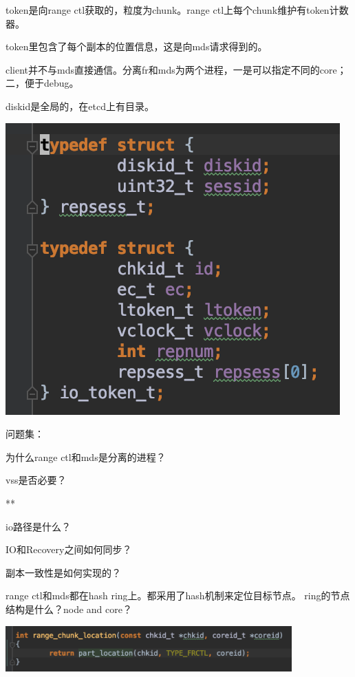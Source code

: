 token是向range ctl获取的，粒度为chunk。range ctl上每个chunk维护有token计数器。

token里包含了每个副本的位置信息，这是向mds请求得到的。

client并不与mds直接通信。分离fr和mds为两个进程，一是可以指定不同的core；二，便于debug。

diskid是全局的，在etcd上有目录。

\begin{center}
\includegraphics{../imgs/token.png}
\end{center}

问题集：
\begin{enumbox}
\item 为什么range ctl和mds是分离的进程？
\item vss是否必要？
\item ***
\item io路径是什么？
\item IO和Recovery之间如何同步？
\item 副本一致性是如何实现的？
\end{enumbox}

range ctl和mds都在hash ring上。都采用了hash机制来定位目标节点。
ring的节点结构是什么？node and core？
\begin{center}
\includegraphics[width=11cm]{../imgs/chunk-location.png}
\end{center}

